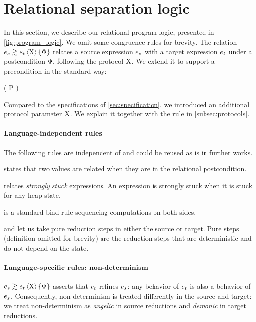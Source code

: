 \section{Relational separation logic}
\label{sec:program_logic}



In this section, we describe our relational program logic, presented in \cref{fig:program_logic}.
We omit some congruence rules for brevity.
The relation $\iSimv[\iProt]{\iPred}{\datalangExpr_s}{\datalangExpr_t}$ relates a source expression $\datalangExpr_s$ with a target expression $\datalangExpr_t$ under a postcondition $\Phi$, following the protocol $\mathrm{X}$.
We extend it to support a precondition in the standard way:
\begin{mathline}
    \coloneqq
    \iPersistent \left( P \iWand {} \right)
\end{mathline}
%
Compared to the specifications of \cref{sec:specification}, we introduced an additional protocol parameter $\mathrm{X}$.
We explain it together with the  rule in \cref{subsec:protocols}.

\paragraph{Language-independent rules}
The following rules are independent of \DataLang and could be reused as is in further works.

 states that two values are related when they are in the relational postcondition.

 relates \emph{strongly stuck} expressions.
An expression is strongly stuck when it is stuck for any heap state.

 is a standard bind rule sequencing computations on both sides.

 and  let us take pure reduction steps in either the source or target.
Pure steps (definition omitted for brevity) are the reduction steps that are deterministic and do not depend on the state.

\paragraph{Language-specific rules: non-determinism}
$\iSimv[\iProt]{\iPred}{\datalangExpr_s}{\datalangExpr_t}$ asserts that $\datalangExpr_t$ refines $\datalangExpr_s$: any behavior of $\datalangExpr_t$ is also a behavior of $\datalangExpr_s$.
Consequently, non-determinism is treated differently in the source and target: we treat non-determinism as \emph{angelic} in source reductions and \emph{demonic} in target reductions.

